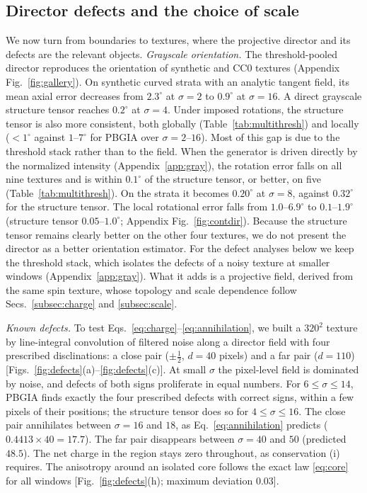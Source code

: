 \documentclass[11pt,a4paper]{article}
\begin{document}
\subsection{Director defects and the choice of scale}\label{subsec:res:defects}
We now turn from boundaries to textures, where the projective director and its defects are the relevant objects. \emph{Grayscale orientation.} The threshold-pooled director reproduces the orientation of synthetic and CC0 textures (Appendix Fig.~\ref{fig:gallery}). On synthetic curved strata with an analytic tangent field, its mean axial error decreases from $2.3^\circ$ at $\sigma=2$ to $0.9^\circ$ at $\sigma=16$. A direct grayscale structure tensor reaches $0.2^\circ$ at $\sigma=4$. Under imposed rotations, the structure tensor is also more consistent, both globally (Table~\ref{tab:multithresh}) and locally ($<1^\circ$ against $1$--$7^\circ$ for PBGIA over $\sigma=2$--$16$). Most of this gap is due to the threshold stack rather than to the field. When the generator is driven directly by the normalized intensity (Appendix~\ref{app:gray}), the rotation error falls on all nine textures and is within $0.1^\circ$ of the structure tensor, or better, on five (Table~\ref{tab:multithresh}). On the strata it becomes $0.20^\circ$ at $\sigma=8$, against $0.32^\circ$ for the structure tensor. The local rotational error falls from $1.0$--$6.9^\circ$ to $0.1$--$1.9^\circ$ (structure tensor $0.05$--$1.0^\circ$; Appendix Fig.~\ref{fig:contdir}). Because the structure tensor remains clearly better on the other four textures, we do not present the director as a better orientation estimator. For the defect analyses below we keep the threshold stack, which isolates the defects of a noisy texture at smaller windows (Appendix~\ref{app:gray}). What it adds is a projective field, derived from the same spin texture, whose topology and scale dependence follow Secs.~\ref{subsec:charge} and \ref{subsec:scale}.

\emph{Known defects.} To test Eqs.~\eqref{eq:charge}--\eqref{eq:annihilation}, we built a $320^2$ texture by line-integral convolution of filtered noise along a director field with four prescribed disclinations: a close pair ($\pm\tfrac12$, $d=40$ pixels) and a far pair ($d=110$) [Figs.~\ref{fig:defects}(a)--\ref{fig:defects}(c)]. At small $\sigma$ the pixel-level field is dominated by noise, and defects of both signs proliferate in equal numbers. For $6\le\sigma\le14$, PBGIA finds exactly the four prescribed defects with correct signs, within a few pixels of their positions; the structure tensor does so for $4\le\sigma\le16$. The close pair annihilates between $\sigma=16$ and $18$, as Eq.~\eqref{eq:annihilation} predicts ($0.4413\times40=17.7$). The far pair disappears between $\sigma=40$ and $50$ (predicted $48.5$). The net charge in the region stays zero throughout, as conservation (i) requires. The anisotropy around an isolated core follows the exact law \eqref{eq:core} for all windows [Fig.~\ref{fig:defects}(h); maximum deviation $0.03$].
\end{document}
